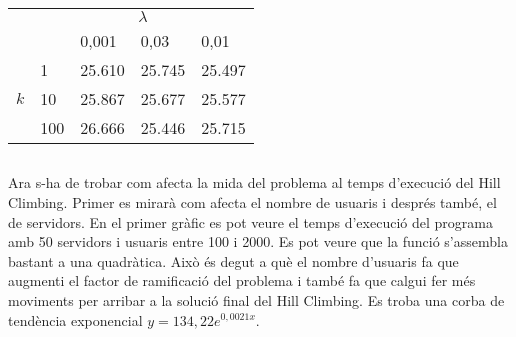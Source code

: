 \documentclass[a4paper, 12pt]{article}
\begin{document}
\begin{minipage}{\linewidth}
\begin{minipage}[b]{0.32\linewidth}
	\end{minipage}
	\hfill
	\begin{minipage}[b]{0.33\linewidth}
		\scriptsize
		\centering
		\begin{tabular}{l | l | l | l | l|}
			\multicolumn{1}{c}{} & \multicolumn{4}{c}{$\lambda$} \\
			\cline{3-5}
			\multicolumn{2}{c|}{} & 0,001 & 0,03 & 0,01 \\
			\cline{2-5}
			\multirow{3}{*}{$k$}
			& 1 & \cellcolor{Goldenrod!60} 25.610 & \cellcolor{Red!60} 25.745 &\cellcolor{Green!40} 25.497 \\
			& 10 & \cellcolor{Goldenrod!70}25.867 & \cellcolor{Red!40} 25.677 & \cellcolor{Green!60}25.577 \\
			& 100 & \cellcolor{Red}26.666 & \cellcolor{Green}25.446 & \cellcolor{Goldenrod!60}25.715 \\
			\cline{2-5}
		\end{tabular}
	\end{minipage}
\end{minipage}

\vspace{1cm}

\subsection{}

Ara s-ha de trobar com afecta la mida del problema al temps d'execució del Hill Climbing. Primer es mirarà com afecta 
el nombre de usuaris i després també, el de servidors. En el primer gràfic es pot veure el temps d'execució del programa 
amb 50 servidors i usuaris entre 100 i 2000. Es pot veure que la funció s'assembla bastant a una quadràtica. Això és degut
a què el nombre d'usuaris fa que augmenti el factor de ramificació del problema i també fa que calgui fer més moviments 
per arribar a la solució final del Hill Climbing. Es troba una corba
de tendència exponencial $ y = 134,22e^{0,0021x} $.

\vspace{1cm}
\end{document}
